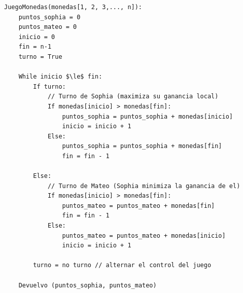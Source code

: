 \begin{lstlisting}[mathescape=true]
JuegoMonedas(monedas[1, 2, 3,..., n]):
    puntos_sophia = 0
    puntos_mateo = 0
    inicio = 0
    fin = n-1
    turno = True
    
    While inicio $\le$ fin:
        If turno:
            // Turno de Sophia (maximiza su ganancia local)
            If monedas[inicio] > monedas[fin]:
                puntos_sophia = puntos_sophia + monedas[inicio]
                inicio = inicio + 1
            Else:
                puntos_sophia = puntos_sophia + monedas[fin]
                fin = fin - 1
    
        Else:
            // Turno de Mateo (Sophia minimiza la ganancia de el)
            If monedas[inicio] > monedas[fin]:
                puntos_mateo = puntos_mateo + monedas[fin]
                fin = fin - 1
            Else:
                puntos_mateo = puntos_mateo + monedas[inicio]
                inicio = inicio + 1
        
        turno = no turno // alternar el control del juego
    
    Devuelvo (puntos_sophia, puntos_mateo)

\end{lstlisting}
